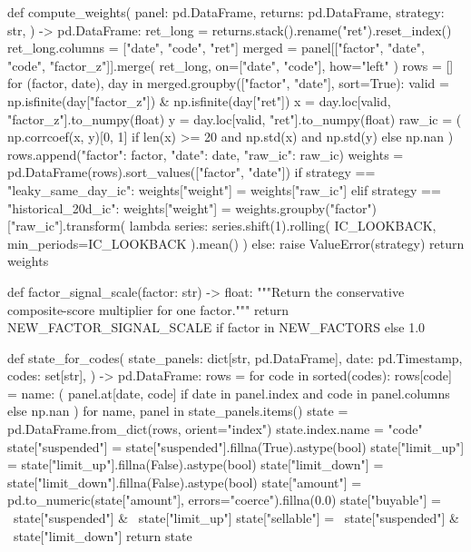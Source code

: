 \documentclass[UTF8,a4paper,fontset=fandol]{ctexart}
\begin{document}
\begin{ProjectCode}
def compute_weights(
    panel: pd.DataFrame,
    returns: pd.DataFrame,
    strategy: str,
) -> pd.DataFrame:
    ret_long = returns.stack().rename("ret").reset_index()
    ret_long.columns = ["date", "code", "ret"]
    merged = panel[["factor", "date", "code", "factor_z"]].merge(
        ret_long, on=["date", "code"], how="left"
    )
    rows = []
    for (factor, date), day in merged.groupby(["factor", "date"], sort=True):
        valid = np.isfinite(day["factor_z"]) & np.isfinite(day["ret"])
        x = day.loc[valid, "factor_z"].to_numpy(float)
        y = day.loc[valid, "ret"].to_numpy(float)
        raw_ic = (
            np.corrcoef(x, y)[0, 1]
            if len(x) >= 20 and np.std(x) and np.std(y)
            else np.nan
        )
        rows.append({"factor": factor, "date": date, "raw_ic": raw_ic})
    weights = pd.DataFrame(rows).sort_values(["factor", "date"])
    if strategy == "leaky_same_day_ic":
        weights["weight"] = weights["raw_ic"]
    elif strategy == "historical_20d_ic":
        weights["weight"] = weights.groupby("factor")["raw_ic"].transform(
            lambda series: series.shift(1).rolling(
                IC_LOOKBACK, min_periods=IC_LOOKBACK
            ).mean()
        )
    else:
        raise ValueError(strategy)
    return weights


def factor_signal_scale(factor: str) -> float:
    """Return the conservative composite-score multiplier for one factor."""
    return NEW_FACTOR_SIGNAL_SCALE if factor in NEW_FACTORS else 1.0


def state_for_codes(
    state_panels: dict[str, pd.DataFrame],
    date: pd.Timestamp,
    codes: set[str],
) -> pd.DataFrame:
    rows = {}
    for code in sorted(codes):
        rows[code] = {
            name: (
                panel.at[date, code]
                if date in panel.index and code in panel.columns
                else np.nan
            )
            for name, panel in state_panels.items()
        }
    state = pd.DataFrame.from_dict(rows, orient="index")
    state.index.name = "code"
    state["suspended"] = state["suspended"].fillna(True).astype(bool)
    state["limit_up"] = state["limit_up"].fillna(False).astype(bool)
    state["limit_down"] = state["limit_down"].fillna(False).astype(bool)
    state["amount"] = pd.to_numeric(state["amount"], errors="coerce").fillna(0.0)
    state["buyable"] = ~state["suspended"] & ~state["limit_up"]
    state["sellable"] = ~state["suspended"] & ~state["limit_down"]
    return state



\end{ProjectCode}
\end{document}
